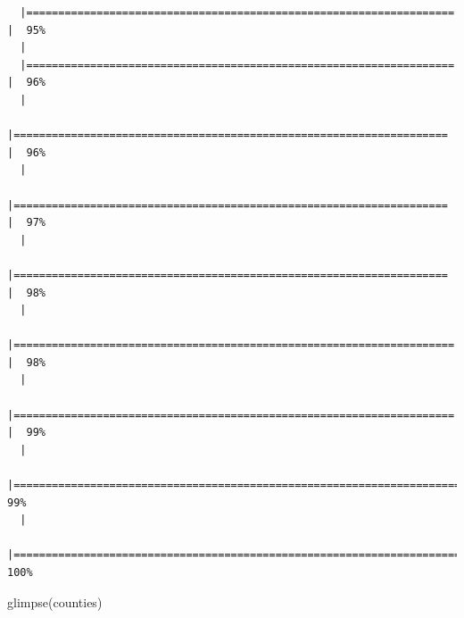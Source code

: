 \documentclass[
  letterpaper,
  DIV=11,
  numbers=noendperiod]{scrreprt}
\newenvironment{Shaded}{\begin{snugshade}}{\end{snugshade}}
\newcommand{\FunctionTok}[1]{\textcolor[rgb]{0.28,0.35,0.67}{#1}}
\newcommand{\NormalTok}[1]{\textcolor[rgb]{0.00,0.23,0.31}{#1}}
\begin{document}
\begin{verbatim}
  |===================================================================   |  95%
  |                                                                            
  |===================================================================   |  96%
  |                                                                            
  |====================================================================  |  96%
  |                                                                            
  |====================================================================  |  97%
  |                                                                            
  |====================================================================  |  98%
  |                                                                            
  |===================================================================== |  98%
  |                                                                            
  |===================================================================== |  99%
  |                                                                            
  |======================================================================|  99%
  |                                                                            
  |======================================================================| 100%
\end{verbatim}

\begin{Shaded}
\begin{Highlighting}[]
\FunctionTok{glimpse}\NormalTok{(counties)}
\end{Highlighting}
\end{Shaded}
\end{document}
